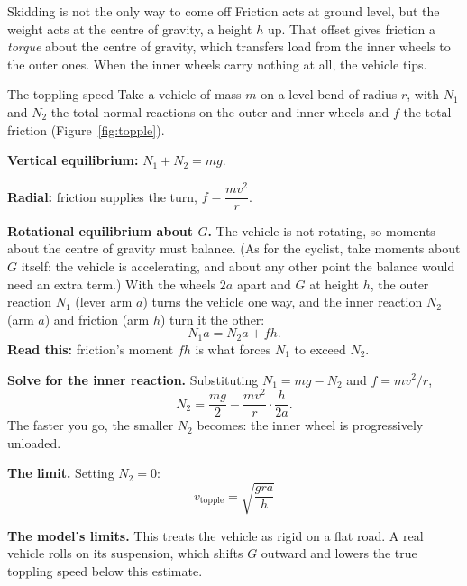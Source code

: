 \begin{motivbox}{Skidding is not the only way to come off}
Friction acts at ground level, but the weight acts at the centre of gravity, a height $h$ up. That offset
gives friction a \emph{torque} about the centre of gravity, which transfers load from the inner wheels
to the outer ones. When the inner wheels carry nothing at all, the vehicle tips.
\end{motivbox}

\begin{figure}[htbp]
\centering
{}
\end{figure}

\begin{derivbox}{The toppling speed}
Take a vehicle of mass $m$ on a level bend of radius $r$, with $N_1$ and $N_2$ the total normal
reactions on the outer and inner wheels and $f$ the total friction (Figure~\ref{fig:topple}).

 \textbf{Vertical equilibrium:} $N_1+N_2=mg$.

 \textbf{Radial:} friction supplies the turn, $f=\dfrac{mv^{2}}{r}$.

 \textbf{Rotational equilibrium about $G$.} The vehicle is not rotating, so moments about the
centre of gravity must balance. (As for the cyclist, take moments about $G$ itself: the vehicle is
accelerating, and about any other point the balance would need an extra term.) With the wheels $2a$
apart and $G$ at height $h$, the outer reaction $N_1$ (lever arm $a$) turns the vehicle one way, and the
inner reaction $N_2$ (arm $a$) and friction (arm $h$) turn it the other:
\[
N_1 a = N_2 a + f h.
\]
\textbf{Read this:} friction's moment $fh$ is what forces $N_1$ to exceed $N_2$.

 \textbf{Solve for the inner reaction.} Substituting $N_1=mg-N_2$ and $f=mv^{2}/r$,
\[
N_2=\frac{mg}{2}-\frac{mv^{2}}{r}\cdot\frac{h}{2a}.
\]
The faster you go, the smaller $N_2$ becomes: the inner wheel is progressively unloaded.

 \textbf{The limit.} Setting $N_2=0$:
\[
\boxed{\;v_{\text{topple}}=\sqrt{\frac{gra}{h}}\;}
\]


\smallskip
\textbf{The model's limits.} This treats the vehicle as rigid on a flat road. A real vehicle rolls on its
suspension, which shifts $G$ outward and lowers the true toppling speed below this estimate.
\end{derivbox}

